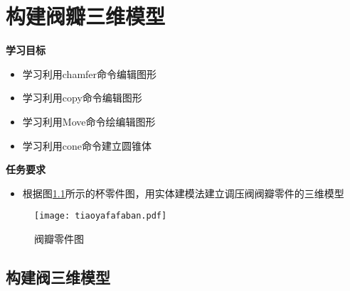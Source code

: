\chapter{构建阀瓣三维模型}

{\bfseries 学习目标}
\begin{itemize}
\item 学习利用chamfer命令编辑图形
\item 学习利用copy命令编辑图形
\item 学习利用Move命令绘编辑图形
\item 学习利用cone命令建立圆锥体
\end{itemize}

{\bfseries 任务要求}
\begin{itemize}
\item 根据图\ref{fig:tiaoyafafaban}所示的杯零件图，用实体建模法建立调压阀阀瓣零件的三维模型
\end{itemize}

\noindent
\begin{figure}[htbp]
\centering
\texttt{[image: tiaoyafafaban.pdf]}
\caption{阀瓣零件图}\label{fig:tiaoyafafaban}
\end{figure}
\clearpage
\section{构建阀三维模型}


\endinput